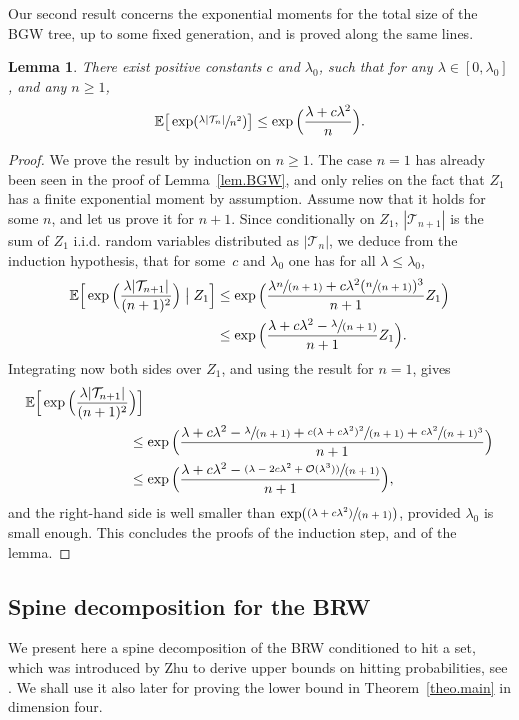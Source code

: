 \documentclass[11pt]{article}
\numberwithin{equation}{section}
\newcommand{\spfrac}[2]{\sfrac{#1}{(#2)}}
\newcommand{\pspfrac}[2]{\sfrac{(#1)}{(#2)}}
\theoremstyle{plain}
\newtheorem{lemma}[theorem]{Lemma}
\theoremstyle{definition}
\newcommand{\1}{{\text{\Large $\mathfrak 1$}}}
\begin{document}
Our second result concerns the exponential moments for the total size of the BGW tree, up to some fixed generation, and is proved along the same lines.
\begin{lemma}\label{lem.BGW2}
There exist positive constants $c$ and $\lambda_0$, such that for any $\lambda\in[0,\lambda_0]$, and any $n\ge 1$,
\begin{equation*}
\mathbb E\big[\exp(\sfrac{\lambda |\mathcal T_n|}{n^2})\big] \le \exp\Big(\frac{\lambda+c\lambda^2}{n}\Big).
\end{equation*}
\end{lemma}
\begin{proof}
We prove the result by induction on $n\ge 1$. The case $n=1$ has already been seen in the proof of Lemma~\ref{lem.BGW},
and only relies on the fact that $Z_1$ has a finite exponential moment by assumption. Assume now that it holds for some $n$, and let us prove
it for $n+1$. Since conditionally on $Z_1$, $|\mathcal T_{n+1}|$ is the sum of $Z_1$ i.i.d. random variables distributed as $|\mathcal T_{n}|$, we deduce from the induction hypothesis, that for some~$c$ and $\lambda_0$ one has for all $\lambda\le \lambda_0$,
\begin{align*}
\mathbb E\Big[\exp\Big(\frac{\lambda |\mathcal T_{n+1}|}{(n+1)^2}\Big)\bigm| Z_1\Big]
&\le \exp\Big(\frac{\lambda\spfrac{n}{n+1}+c\lambda^2(\spfrac{n}{n+1})^3}{n+1}Z_1\Big)\\
&\le \exp\Big(\frac{\lambda+c\lambda^2 - \spfrac{\lambda}{n+1} }{n+1}Z_1\Big).
\end{align*}
Integrating now both sides over $Z_1$, and using the result for $n=1$, gives
\begin{align*}
\mathbb E\Big[\exp\Big(\frac{\lambda |\mathcal T_{n+1}|}{(n+1)^2}&\Big)\Big]\\
&\le \exp\Big(\frac{\lambda+c\lambda^2 - \spfrac{\lambda}{n+1}+\spfrac{c(\lambda + c\lambda^2)^2}{n+1} +\sfrac{c\lambda^2}{(n+1)^3}}{n+1}\Big)\\
&\le \exp\Big(\frac{\lambda+c\lambda^2 - \pspfrac{\lambda - 2c\lambda^2+ \mathcal O(\lambda^3)}{n+1} }{n+1} \Big),
\end{align*}
and the right-hand side is well smaller than $\exp(\pspfrac{\lambda + c\lambda^2}{n+1})$, provided $\lambda_0$ is small enough.
This concludes the proofs of the induction step, and of the lemma.
\end{proof}

\subsection{Spine decomposition for the BRW}
We present here a spine decomposition of the BRW conditioned to hit a set, which was introduced by Zhu to derive upper bounds on hitting probabilities, see \cite{Zhu1, Zhu3}. We shall
use it also later for proving the lower bound in Theorem~\ref{theo.main}
in dimension four.
\end{document}
